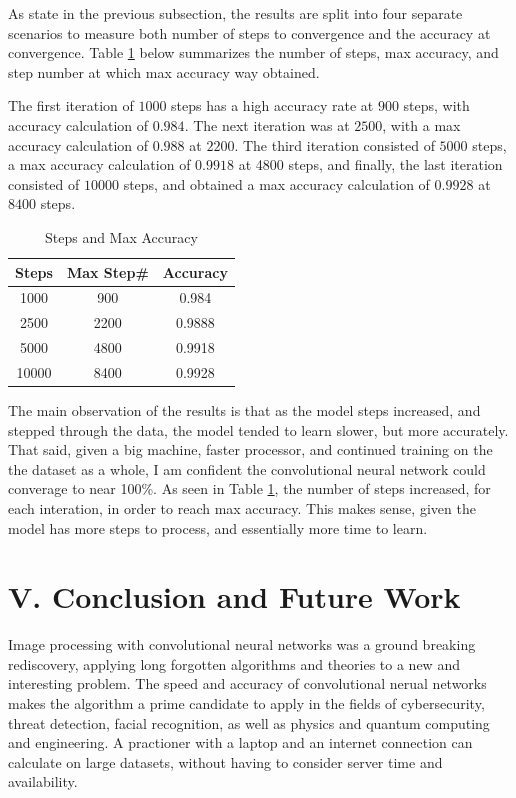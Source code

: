 \documentclass[conference,final,]{IEEEtran}
\begin{document}
As state in the previous subsection, the results are split into four
separate scenarios to measure both number of steps to convergence and
the accuracy at convergence. Table \ref{table:accr} below summarizes the
number of steps, max accuracy, and step number at which max accuracy way
obtained.

The first iteration of \(1000\) steps has a high accuracy rate at
\(900\) steps, with accuracy calculation of \(0.984\). The next
iteration was at \(2500\), with a max accuracy calculation of \(0.988\)
at \(2200\). The third iteration consisted of \(5000\) steps, a max
accuracy calculation of \(0.9918\) at 4800 steps, and finally, the last
iteration consisted of \(10000\) steps, and obtained a max accuracy
calculation of \(0.9928\) at \(8400\) steps.

\begin{table}[h]
    \caption{Steps and Max Accuracy}
    \centering
        \begin{tabular}{c c c}
            \hline \hline
            Steps & Max Step\# & Accuracy \\ [1ex]
            \hline
            1000  & 900  & 0.984 \\
            2500  & 2200 & 0.9888 \\
            5000  & 4800 & 0.9918 \\
            10000 & 8400 & 0.9928 \\  [1ex]
            \hline
        \end{tabular}
    \label{table:accr}
\end{table}

The main observation of the results is that as the model steps
increased, and stepped through the data, the model tended to learn
slower, but more accurately. That said, given a big machine, faster
processor, and continued training on the the dataset as a whole, I am
confident the convolutional neural network could converage to near
100\%. As seen in Table \ref{table:accr}, the number of steps increased,
for each interation, in order to reach max accuracy. This makes sense,
given the model has more steps to process, and essentially more time to
learn.

\section{V. Conclusion and Future
Work}\label{v.-conclusion-and-future-work}

Image processing with convolutional neural networks was a ground
breaking rediscovery, applying long forgotten algorithms and theories to
a new and interesting problem. The speed and accuracy of convolutional
nerual networks makes the algorithm a prime candidate to apply in the
fields of cybersecurity, threat detection, facial recognition, as well
as physics and quantum computing and engineering. A practioner with a
laptop and an internet connection can calculate on large datasets,
without having to consider server time and availability.
\end{document}
